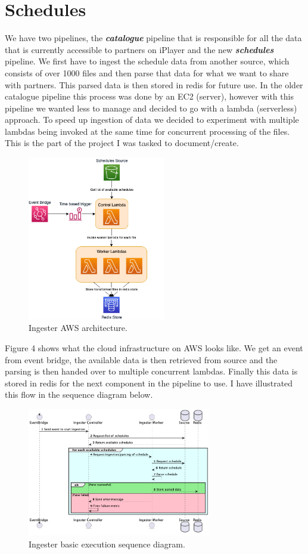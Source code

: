 \section{Schedules}

  We have two pipelines, the \textbf{\textit{catalogue}} pipeline that is responsible for all the data that is currently accessible to partners on iPlayer
  and the new \textbf{\textit{schedules}} pipeline. We first have to ingest the schedule data from another source, which consists of over 1000 files and 
  then parse that data for what we want to share with partners. This parsed data is then stored in redis for future use. In the older catalogue pipeline 
  this process was done by an EC2 (server), however with this pipeline we wanted less to manage and decided to go with a lambda (serverless) approach. To speed 
  up ingestion of data we decided to experiment with multiple lambdas being invoked at the same time for concurrent processing of the files. 
  This is the part of the project I was tasked to document/create.
  
  \begin{figure}[H]
    \centering
    \includegraphics[width=6cm]{assets/ingester.drawio.png}
    \caption{Ingester AWS architecture.}
    \label{fig:ingesterArch}
  \end{figure}

  Figure 4 shows what the cloud infrastructure on AWS looks like. We get an event from event bridge, the available data is then retrieved from source and the
  parsing is then handed over to multiple concurrent lambdas. Finally this data is stored in redis for the next component in the pipeline to use. I have 
  illustrated this flow in the sequence diagram below.

  \begin{figure}[H]
    \centering
    \includegraphics[width=8cm]{assets/diagrams/ingesterBasicFlow.png}
    \caption{Ingester basic execution sequence diagram.}
    \label{fig:ingesterFlow}
  \end{figure}


